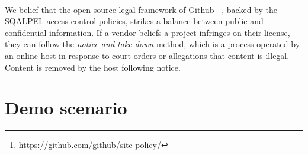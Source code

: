 \documentclass{cidr-2019}
\begin{document}
We belief that the open-source legal framework of Github~\footnote{https://github.com/github/site-policy/}, backed by the {\sc SQALPEL} access control policies, strikes a balance between public and confidential information.
If a vendor beliefs a project infringes on their license, they can follow the
\emph{notice and take down}  method, which is a process operated by an online host
in response to court orders or allegations that content is illegal. Content is removed by the host following notice.



\section{Demo scenario}\label{demo}

 
 
 
\end{document}
